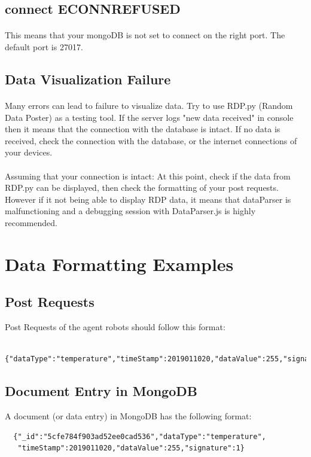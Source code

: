 \documentclass{article}
\begin{document}
\subsection{connect ECONNREFUSED}
\paragraph{} This means that your mongoDB is not set to connect on the right port. The default port is 27017.

\subsection{Data Visualization Failure}
\paragraph{} Many errors can lead to failure to visualize data. Try to use RDP.py (Random Data Poster) as a testing tool. If the server logs "new data received" in console then it means that 
the connection with the database is intact. If no data is received, check the connection with the database, or the internet connections of your devices.
\paragraph{} Assuming that your connection is intact: At this point, check if the data from RDP.py can be displayed, then check the formatting of your post requests. However if
it not being able to display RDP data, it means that dataParser is malfunctioning and a debugging session with DataParser.js is highly recommended.


\section{Data Formatting Examples}
\subsection{Post Requests}Post Requests of the agent robots should follow this format:
\begin{lstlisting}
  {"dataType":"temperature","timeStamp":2019011020,"dataValue":255,"signature":1}
\end{lstlisting}

\subsection{Document Entry in MongoDB} A document (or data entry) in MongoDB has the following format:
\begin{lstlisting}
  {"_id":"5cfe784f903ad52ee0cad536","dataType":"temperature",
   "timeStamp":2019011020,"dataValue":255,"signature":1}
\end{lstlisting}
\end{document}
